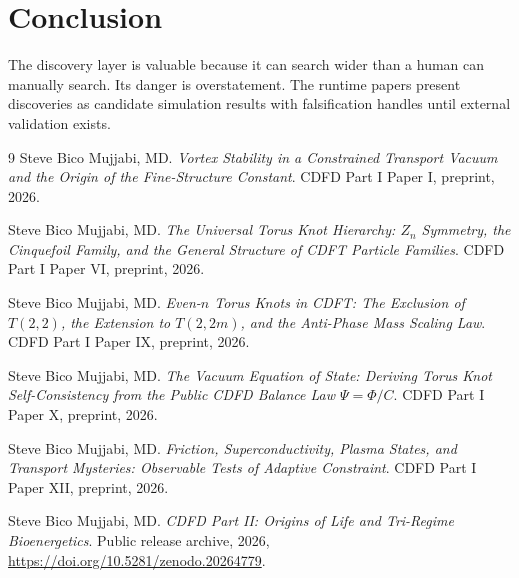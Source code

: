 \documentclass[12pt,a4paper]{article}
\begin{document}
\section{Conclusion}
The discovery layer is valuable because it can search wider than a human can
manually search. Its danger is overstatement. The runtime papers present
discoveries as candidate simulation results with falsification handles until
external validation exists.
\begin{thebibliography}{9}
Steve Bico Mujjabi, MD. \emph{Vortex Stability in a Constrained Transport Vacuum and the Origin of the Fine-Structure Constant}. CDFD Part I Paper I, preprint, 2026.

Steve Bico Mujjabi, MD. \emph{The Universal Torus Knot Hierarchy: $Z_n$ Symmetry, the Cinquefoil Family, and the General Structure of CDFT Particle Families}. CDFD Part I Paper VI, preprint, 2026.

Steve Bico Mujjabi, MD. \emph{Even-$n$ Torus Knots in CDFT: The Exclusion of $T(2,2)$, the Extension to $T(2,2m)$, and the Anti-Phase Mass Scaling Law}. CDFD Part I Paper IX, preprint, 2026.

Steve Bico Mujjabi, MD. \emph{The Vacuum Equation of State: Deriving Torus Knot Self-Consistency from the Public CDFD Balance Law $\Psi = \Phi/C$}. CDFD Part I Paper X, preprint, 2026.

Steve Bico Mujjabi, MD. \emph{Friction, Superconductivity, Plasma States, and Transport Mysteries: Observable Tests of Adaptive Constraint}. CDFD Part I Paper XII, preprint, 2026.

Steve Bico Mujjabi, MD. \emph{CDFD Part II: Origins of Life and Tri-Regime Bioenergetics}. Public release archive, 2026, \url{https://doi.org/10.5281/zenodo.20264779}.
\end{thebibliography}
\end{document}
